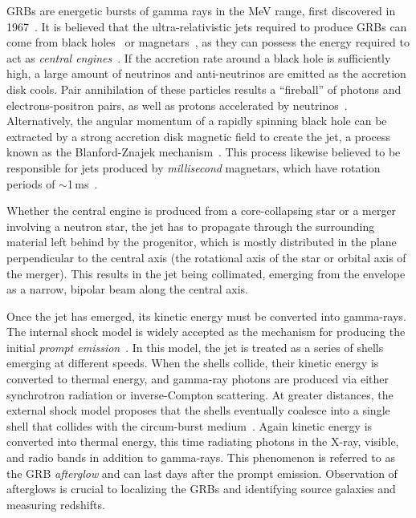 \Acp{GRB} are energetic bursts of gamma rays in the MeV range, first discovered in 1967~\citep{Klebesadel_1973}.
It is believed that the ultra-relativistic jets required to produce \acp{GRB} can come from black holes~\citep{Woosley_1993} or magnetars~\citep{Dai_1998}, as they can possess the energy required to act as \textit{central engines}~\citep{Kumar_2015}.
If the accretion rate around a black hole is sufficiently high, a large amount of neutrinos and anti-neutrinos are emitted as the accretion disk cools.
Pair annihilation of these particles results a ``fireball'' of photons and electrons-positron pairs, as well as protons accelerated by neutrinos~\citep{Chen_2007}.
Alternatively, the angular momentum of a rapidly spinning black hole can be extracted by a strong accretion disk magnetic field to create the jet, a process known as the Blanford-Znajek mechanism~\citep{Blanford_1977,Lee_2000}.
This process likewise believed to be responsible for jets produced by \textit{millisecond} magnetars, which have rotation periods of $\sim$1\,ms~\citep{Metzger_2011}.

Whether the central engine is produced from a core-collapsing star or a merger involving a neutron star, the jet has to propagate through the surrounding material left behind by the progenitor, which is mostly distributed in the plane perpendicular to the central axis (the rotational axis of the star or orbital axis of the merger).
This results in the jet being collimated, emerging from the envelope as a narrow, bipolar beam along the central axis.

Once the jet has emerged, its kinetic energy must be converted into gamma-rays.
The internal shock model is widely accepted as the mechanism for producing the initial \textit{prompt emission}~\citep{Rees_1994}.
In this model, the jet is treated as a series of shells emerging at different speeds.
When the shells collide, their kinetic energy is converted to thermal energy, and gamma-ray photons are produced via either synchrotron radiation or inverse-Compton scattering.
At greater distances, the external shock model proposes that the shells eventually coalesce into a single shell that collides with the circum-burst medium~\citep{Blandford_1976}.
Again kinetic energy is converted into thermal energy, this time radiating photons in the X-ray, visible, and radio bands in addition to gamma-rays.
This phenomenon is referred to as the GRB \textit{afterglow} and can last days after the prompt emission.
Observation of afterglows is crucial to localizing the GRBs and identifying source galaxies and measuring redshifts.

